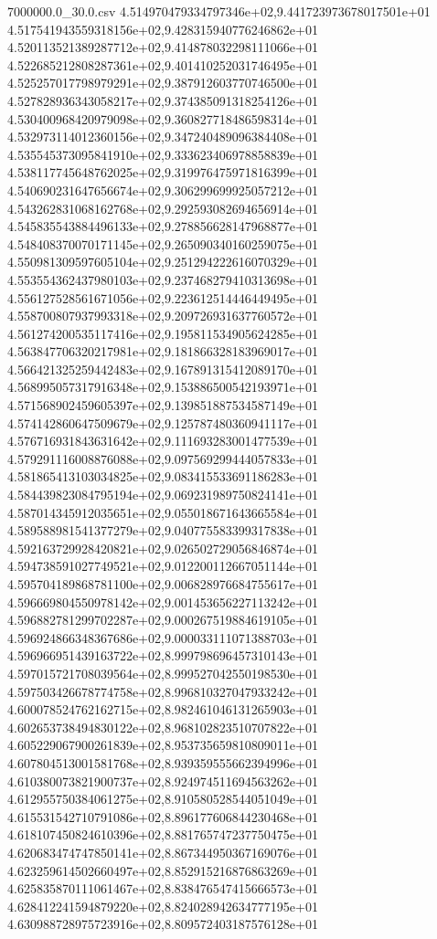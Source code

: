 \begin{filecontents*}{7000000.0_30.0.csv}
4.514970479334797346e+02,9.441723973678017501e+01
4.517541943559318156e+02,9.428315940776246862e+01
4.520113521389287712e+02,9.414878032298111066e+01
4.522685212808287361e+02,9.401410252031746495e+01
4.525257017798979291e+02,9.387912603770746500e+01
4.527828936343058217e+02,9.374385091318254126e+01
4.530400968420979098e+02,9.360827718486598314e+01
4.532973114012360156e+02,9.347240489096384408e+01
4.535545373095841910e+02,9.333623406978858839e+01
4.538117745648762025e+02,9.319976475971816399e+01
4.540690231647656674e+02,9.306299699925057212e+01
4.543262831068162768e+02,9.292593082694656914e+01
4.545835543884496133e+02,9.278856628147968877e+01
4.548408370070171145e+02,9.265090340160259075e+01
4.550981309597605104e+02,9.251294222616070329e+01
4.553554362437980103e+02,9.237468279410313698e+01
4.556127528561671056e+02,9.223612514446449495e+01
4.558700807937993318e+02,9.209726931637760572e+01
4.561274200535117416e+02,9.195811534905624285e+01
4.563847706320217981e+02,9.181866328183969017e+01
4.566421325259442483e+02,9.167891315412089170e+01
4.568995057317916348e+02,9.153886500542193971e+01
4.571568902459605397e+02,9.139851887534587149e+01
4.574142860647509679e+02,9.125787480360941117e+01
4.576716931843631642e+02,9.111693283001477539e+01
4.579291116008876088e+02,9.097569299444057833e+01
4.581865413103034825e+02,9.083415533691186283e+01
4.584439823084795194e+02,9.069231989750824141e+01
4.587014345912035651e+02,9.055018671643665584e+01
4.589588981541377279e+02,9.040775583399317838e+01
4.592163729928420821e+02,9.026502729056846874e+01
4.594738591027749521e+02,9.012200112667051144e+01
4.595704189868781100e+02,9.006828976684755617e+01
4.596669804550978142e+02,9.001453656227113242e+01
4.596882781299702287e+02,9.000267519884619105e+01
4.596924866348367686e+02,9.000033111071388703e+01
4.596966951439163722e+02,8.999798696457310143e+01
4.597015721708039564e+02,8.999527042550198530e+01
4.597503426678774758e+02,8.996810327047933242e+01
4.600078524762162715e+02,8.982461046131265903e+01
4.602653738494830122e+02,8.968102823510707822e+01
4.605229067900261839e+02,8.953735659810809011e+01
4.607804513001581768e+02,8.939359555662394996e+01
4.610380073821900737e+02,8.924974511694563262e+01
4.612955750384061275e+02,8.910580528544051049e+01
4.615531542710791086e+02,8.896177606844230468e+01
4.618107450824610396e+02,8.881765747237750475e+01
4.620683474747850141e+02,8.867344950367169076e+01
4.623259614502660497e+02,8.852915216876863269e+01
4.625835870111061467e+02,8.838476547415666573e+01
4.628412241594879220e+02,8.824028942634777195e+01
4.630988728975723916e+02,8.809572403187576128e+01

\end{filecontents*}
